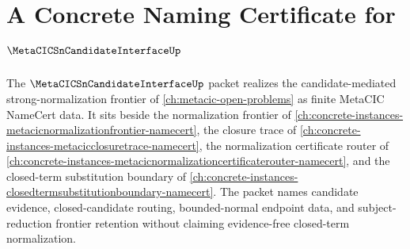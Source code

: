 \chapter{A Concrete Naming Certificate for $\MetaCICSnCandidateInterfaceUp$}
\label{ch:concrete-instances-metacic-sn-candidate-interface-namecert}

The $\MetaCICSnCandidateInterfaceUp$ packet realizes the candidate-mediated strong-normalization frontier of \autoref{ch:metacic-open-problems} as finite MetaCIC NameCert data. It sits beside the normalization frontier of \autoref{ch:concrete-instances-metacicnormalizationfrontier-namecert}, the closure trace of \autoref{ch:concrete-instances-metacicclosuretrace-namecert}, the normalization certificate router of \autoref{ch:concrete-instances-metacicnormalizationcertificaterouter-namecert}, and the closed-term substitution boundary of \autoref{ch:concrete-instances-closedtermsubstitutionboundary-namecert}. The packet names candidate evidence, closed-candidate routing, bounded-normal endpoint data, and subject-reduction frontier retention without claiming evidence-free closed-term normalization.

